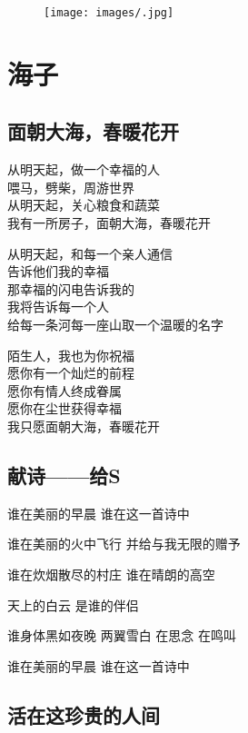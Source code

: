 \documentclass[]{book}
\renewenvironment{quote}{\begin{VF}}{\end{VF}}
\begin{document}
\begin{figure}[htbp]
\centering
\texttt{[image: images/.jpg]}
\caption{}
\end{figure}

\chapter{海子}

\section{面朝大海，春暖花开}

\begin{quote}
从明天起，做一个幸福的人\\
喂马，劈柴，周游世界\\
从明天起，关心粮食和蔬菜\\
我有一所房子，面朝大海，春暖花开

从明天起，和每一个亲人通信\\
告诉他们我的幸福\\
那幸福的闪电告诉我的\\
我将告诉每一个人\\
给每一条河每一座山取一个温暖的名字

陌生人，我也为你祝福\\
愿你有一个灿烂的前程\\
愿你有情人终成眷属\\
愿你在尘世获得幸福\\
我只愿面朝大海，春暖花开
\end{quote}

\section{献诗------给S}\label{s}

\begin{quote}
谁在美丽的早晨 谁在这一首诗中

谁在美丽的火中飞行 并给与我无限的赠予

谁在炊烟散尽的村庄 谁在晴朗的高空

天上的白云 是谁的伴侣

谁身体黑如夜晚 两翼雪白 在思念 在鸣叫

谁在美丽的早晨 谁在这一首诗中
\end{quote}

\section{活在这珍贵的人间}
\end{document}
